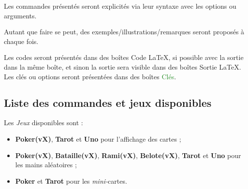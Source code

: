 \documentclass{article}
\newcommand\Cle[1]{{\bfseries\sffamily\textlangle #1\textrangle}}
\begin{document}
{{{{{{{{{\begin{codeinfo}
Les \textsf{commandes} présentés seront explicités via leur \textsf{syntaxe} avec les \textsf{options} ou \textsf{arguments}.

Autant que faire se peut, des exemples/illustrations/remarques seront proposés à chaque fois.

\smallskip

Les \textsf{codes} seront présentés dans des \textsf{boîtes} \textcolor{red!75!black}{{\small \faCode} Code \LaTeX}, si possible avec la \textsf{sortie} dans la même boîte, et sinon la \textsf{sortie} sera visible dans des \textsf{boîtes} \textcolor{red!75!black}{{\small \faArrowAltCircleRight[regular]} Sortie \LaTeX}. Les \textsf{clés} ou \textsf{options} seront présentées dans des \textsf{boîtes} \textcolor{ForestGreen}{{\small \faPaperclip} Clés}.
\end{codeinfo}

\subsection{Liste des commandes et jeux disponibles}

\begin{codeinfo}
Les \textit{Jeux} disponibles sont :

\begin{itemize}
	\item \Cle{Poker(vX)}, \Cle{Tarot} et \Cle{Uno} pour l'affichage des cartes ;
	\item \Cle{Poker(vX)}, \Cle{Bataille(vX)}, \Cle{Rami(vX)}, \Cle{Belote(vX)}, \Cle{Tarot}  et \Cle{Uno} pour les mains aléatoires ;
	\item \Cle{Poker} et \Cle{Tarot} pour les \textit{mini-}cartes.
\end{itemize}
\end{codeinfo}

\begin{codetex}






\end{codetex}}}}}}}}}}
\end{document}
